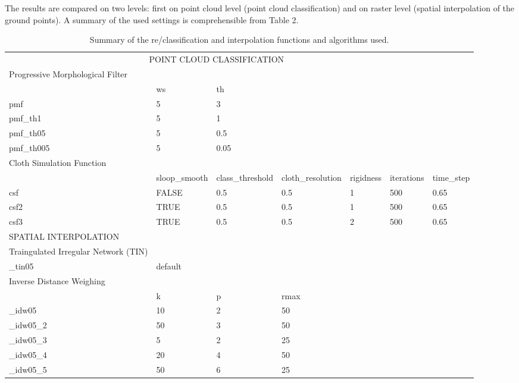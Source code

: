 \documentclass[
  12pt,
]{article}
\begin{document}
The results are compared on two levels: first on point cloud level (point cloud classification) and on raster level (spatial interpolation of the ground points). A summary of the used settings is comprehensible from Table 2.

\begingroup\fontsize{7}{9}\selectfont

\begin{longtable}[t]{lllllll}
\caption{\label{tab:Table2}Summary of the re/classification and interpolation functions and algorithms used.}\\
\toprule
\multicolumn{6}{c}{ POINT CLOUD CLASSIFICATION} & \multicolumn{1}{c}{ } \\
\cmidrule(l{3pt}r{3pt}){1-6}
Progressive Morphological Filter &  &  &  &  &  & \\
 & ws & th &  &  &  & \\
pmf & 5 & 3 &  &  &  & \\
pmf\_th1 & 5 & 1 &  &  &  & \\
pmf\_th05 & 5 & 0.5 &  &  &  & \\
\addlinespace
pmf\_th005 & 5 & 0.05 &  &  &  & \\
Cloth Simulation Function &  &  &  &  &  & \\
 & sloop\_smooth & class\_threshold & cloth\_resolution & rigidness & iterations & time\_step\\
csf & FALSE & 0.5 & 0.5 & 1 & 500 & 0.65\\
csf2 & TRUE & 0.5 & 0.5 & 1 & 500 & 0.65\\
\addlinespace
csf3 & TRUE & 0.5 & 0.5 & 2 & 500 & 0.65\\
SPATIAL INTERPOLATION &  &  &  &  &  & \\
Traingulated Irregular Network (TIN) &  &  &  &  &  & \\
\_tin05 & default &  &  &  &  & \\
Inverse Distance Weighing &  &  &  &  &  & \\
\addlinespace
 & k & p & rmax &  &  & \\
\_idw05 & 10 & 2 & 50 &  &  & \\
\_idw05\_2 & 50 & 3 & 50 &  &  & \\
\_idw05\_3 & 5 & 2 & 25 &  &  & \\
\_idw05\_4 & 20 & 4 & 50 &  &  & \\
\addlinespace
\_idw05\_5 & 50 & 6 & 25 &  &  & \\
\bottomrule
\end{longtable}
\endgroup{}
\end{document}
